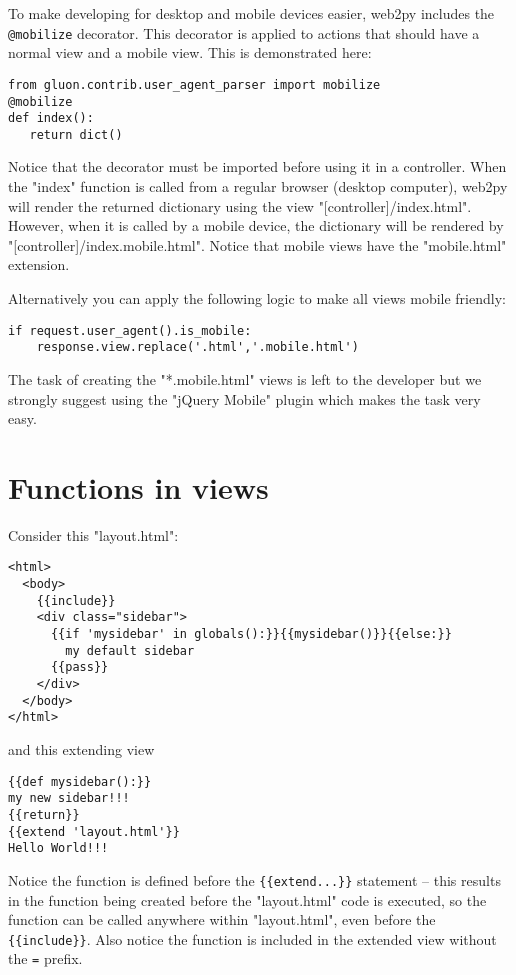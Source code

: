 \documentclass[justified,sixbynine,notoc]{tufte-book}
\def\ft{\small\tt}
\begin{document}
\begin{fullwidth}
To make developing for desktop and mobile devices easier, web2py includes the {\ft @mobilize} decorator. This decorator is applied to actions that should have a normal view and a mobile view. This is demonstrated here:

\begin{lstlisting}
from gluon.contrib.user_agent_parser import mobilize
@mobilize
def index():
   return dict()
\end{lstlisting}

Notice that the decorator must be imported before using it in a controller.
When the "index" function is called from a regular browser (desktop computer), web2py will render the returned dictionary using the view "[controller]/index.html". However, when it is called by a mobile device, the dictionary will be rendered by "[controller]/index.mobile.html". Notice that mobile views have the "mobile.html" extension.

Alternatively you can apply the following logic to make all views mobile friendly:

\begin{lstlisting}
if request.user_agent().is_mobile:
    response.view.replace('.html','.mobile.html')
\end{lstlisting}

The task of creating the "*.mobile.html" views is left to the developer but we strongly suggest using the "jQuery Mobile" plugin which makes the task very easy.

\goodbreak\section{Functions in views}

Consider this "layout.html":

\begin{lstlisting}[keywords={}]
<html>
  <body>
    {{include}}
    <div class="sidebar">
      {{if 'mysidebar' in globals():}}{{mysidebar()}}{{else:}}
        my default sidebar
      {{pass}}
    </div>
  </body>
</html>
\end{lstlisting}
\noindent and this extending view

\begin{lstlisting}[keywords={}]
{{def mysidebar():}}
my new sidebar!!!
{{return}}
{{extend 'layout.html'}}
Hello World!!!
\end{lstlisting}

Notice the function is defined before the {\ft \{\{extend...\}\}} statement -- this results in the function being created before the "layout.html" code is executed, so the function can be called anywhere within "layout.html", even before the {\ft \{\{include\}\}}. Also notice the function is included in the extended view without the {\ft =} prefix.


\end{fullwidth}
\end{document}
